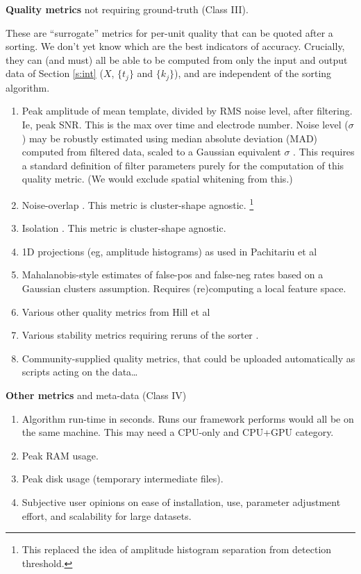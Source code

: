 \documentclass[10pt]{article}
\newcommand{\ben}{\begin{enumerate}}
\newcommand{\een}{\end{enumerate}}
\begin{document}
\item {\bf Quality metrics} not requiring ground-truth (Class III).
  
  These are ``surrogate'' metrics for per-unit quality that
  can be quoted after a sorting.
  We don't yet know which are the best indicators of accuracy.
  Crucially, they can (and must) all be able to be
  computed from only the input and output data of Section \eqref{s:int}
  ($X$, $\{t_j\}$ and $\{k_j\}$),
  and are independent of the sorting algorithm.
  \ben
\item Peak amplitude of mean template, divided by RMS noise level,
  after filtering.
  Ie, peak SNR. This is the max over time and electrode number.
  Noise level ($\sigma$)
  may be robustly estimated using median absolute deviation (MAD) computed
  from filtered data,
  scaled to a Gaussian equivalent $\sigma$ \cite[(3.1)]{spc}.
  This requires a standard definition of filter parameters purely for the
  computation of this quality metric.
  (We would exclude spatial whitening from this.)
\item Noise-overlap \cite{mountainsort}. This metric is cluster-shape agnostic.
  \footnote{This replaced the idea of amplitude histogram separation from detection threshold.}
\item Isolation \cite{mountainsort}. This metric is cluster-shape agnostic.
\item 1D projections (eg, amplitude histograms) as used in Pachitariu et al \cite{kilosort}
\item Mahalanobis-style estimates of false-pos and false-neg rates
  based on a Gaussian clusters assumption. Requires (re)computing a local
  feature space.
  \item Various other quality metrics from Hill et al \cite{Hill2011}
  \item Various stability metrics requiring reruns of the sorter \cite{validspike}.
\item Community-supplied quality metrics, that could be uploaded automatically as scripts acting on the data\ldots
  \een

\item {\bf Other metrics} and meta-data (Class IV)
  \ben
\item Algorithm run-time in seconds. Runs our framework performs would
  all be on the same machine.
  This may need a CPU-only and CPU+GPU category.
\item Peak RAM usage.
\item Peak disk usage (temporary intermediate files).
\item Subjective user opinions on ease of installation, use, parameter adjustment effort, and scalability for large datasets.
  \een
  
\end{document}
